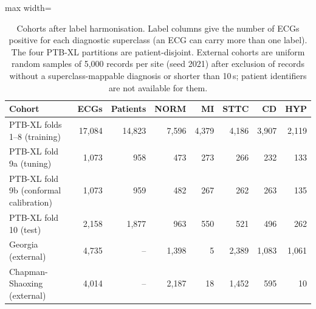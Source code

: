 \begin{table}[!t]
\centering\small
\caption{Cohorts after label harmonisation. Label columns give the number of ECGs positive for each diagnostic superclass (an ECG can carry more than one label). The four PTB-XL partitions are patient-disjoint. External cohorts are uniform random samples of 5,000 records per site (seed 2021) after exclusion of records without a superclass-mappable diagnosis or shorter than 10\,s; patient identifiers are not available for them.}
\label{tab:cohorts}
\setlength{\tabcolsep}{4pt}
\begin{adjustbox}{max width=\linewidth}
\begin{tabular}{lrrrrrrr}
\toprule
Cohort & ECGs & Patients & NORM & MI & STTC & CD & HYP \\
\midrule
PTB-XL folds 1--8 (training) & 17,084 & 14,823 & 7,596 & 4,379 & 4,186 & 3,907 & 2,119 \\
PTB-XL fold 9a (tuning) & 1,073 & 958 & 473 & 273 & 266 & 232 & 133 \\
PTB-XL fold 9b (conformal calibration) & 1,073 & 959 & 482 & 267 & 262 & 263 & 135 \\
PTB-XL fold 10 (test) & 2,158 & 1,877 & 963 & 550 & 521 & 496 & 262 \\
\midrule
Georgia (external) & 4,735 & -- & 1,398 & 5 & 2,389 & 1,083 & 1,061 \\
Chapman-Shaoxing (external) & 4,014 & -- & 2,187 & 18 & 1,452 & 595 & 10 \\
\bottomrule
\end{tabular}
\end{adjustbox}
\end{table}
